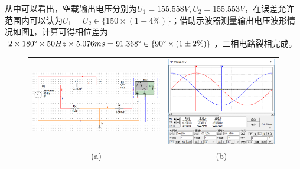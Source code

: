 \documentclass[12pt]{article}%
\begin{document}
从中可以看出，空载输出电压分别为$U_1=155.558V,U_2=155.553V$，在误差允许范围内可以认为$U_1=U_2\in  \{ 150\times (1\pm 4\%)\}$；借助示波器测量输出电压波形情况如图\ref{fig:4}，计算可得相位差为$2\times 180\degree\times 50Hz\times 5.076ms=91.368\degree\in \{90\degree\times (1\pm 2\%)\}$，二相电路裂相完成。
\begin{figure}[htbp]
\centering
\begin{tabular}{cc}
\includegraphics[width=0.48\linewidth]{TIM20180531151220.png}&
\includegraphics[width=0.48\linewidth]{TIM20180531151209.png}\\
(a)&(b)\\
\end{tabular}
\caption{\heiti{}}\label{fig:4}
\end{figure}
\end{document}
